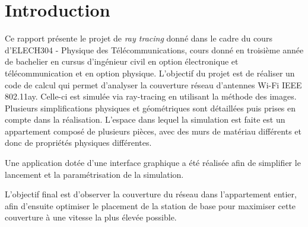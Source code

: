 \chapter*{Introduction}
\label{introduction}
Ce rapport présente le projet de \textit{ray tracing} donné dans le cadre du cours d'ELECH304 - Physique des Télécommunications, cours donné en troisième année de bachelier en cursus d'ingénieur civil en option électronique et télécommunication et en option physique.
L'objectif du projet est de réaliser un code de calcul qui permet d'analyser la couverture réseau d'antennes Wi-Fi IEEE 802.11ay.
Celle-ci est simulée via ray-tracing en utilisant la méthode des images. Plusieurs simplifications physiques et géométriques sont détaillées puis prises en compte dans la réalisation.
L'espace dans lequel la simulation est faite est un appartement composé de plusieurs pièces, avec des murs de matériau différents et donc de propriétés physiques différentes.

Une application dotée d'une interface graphique a été réalisée afin de simplifier le lancement et la paramétrisation de la simulation.

L'objectif final est d'observer la couverture du réseau dans l'appartement entier, afin d'ensuite optimiser le placement de la station de base pour maximiser cette couverture à une vitesse la plus élevée possible.%

